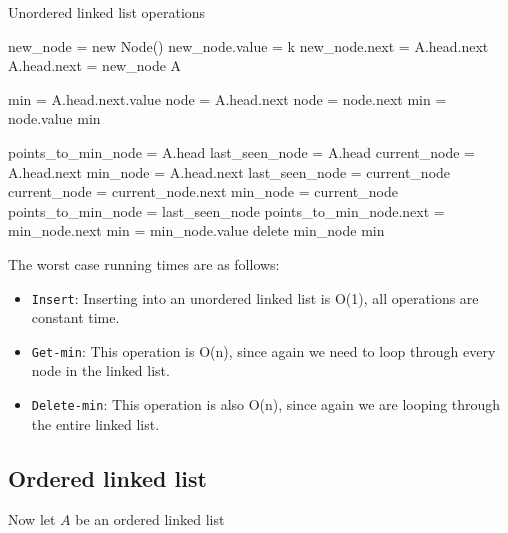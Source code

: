 \documentclass[paper=a4, fontsize=11pt]{scrartcl} %
\numberwithin{equation}{section} %
\numberwithin{figure}{section} %
\numberwithin{table}{section} %
\begin{document}
\begin{algorithm}\small
\caption{Unordered linked list operations}
\begin{algorithmic}
	\State new\_node = new Node()
	\State new\_node.value = k
	\State new\_node.next =  A.head.next
	\State A.head.next = new\_node
	\State \Return A
\EndFunction

	\State min = A.head.next.value
	\State node = A.head.next
		\State node = node.next
			\State min = node.value
		\EndIf
	\EndWhile
	\State \Return min
\EndFunction

	\State points\_to\_min\_node = A.head
	\State last\_seen\_node = A.head
	\State current\_node = A.head.next
	\State min\_node = A.head.next
		\State last\_seen\_node = current\_node
		\State current\_node = current\_node.next
			\State min\_node = current\_node
			\State points\_to\_min\_node = last\_seen\_node
		\EndIf
	\EndWhile
	\State points\_to\_min\_node.next = min\_node.next
	\State min = min\_node.value
	\State delete min\_node
	\State \Return min
\EndFunction
\end{algorithmic}
\end{algorithm}

The worst case running times are as follows:

\begin{itemize}
\item \texttt{Insert}: Inserting into an unordered linked list is O(1), all operations are constant time.
\item \texttt{Get-min}: This operation is O(n), since again we need to loop through every node in the linked list.
\item \texttt{Delete-min}: This operation is also O(n), since again we are looping through the entire linked list.
\end{itemize}

\subsection{Ordered linked list}

Now let $A$ be an ordered linked list
\end{document}
